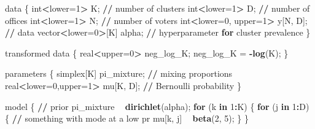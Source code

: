 \documentclass[12pt,letterpaper]{article}
\newenvironment{Shaded}{\begin{snugshade}}{\end{snugshade}}
\newcommand{\ControlFlowTok}[1]{\textcolor[rgb]{0.13,0.29,0.53}{\textbf{#1}}}
\newcommand{\DecValTok}[1]{\textcolor[rgb]{0.00,0.00,0.81}{#1}}
\newcommand{\ErrorTok}[1]{\textcolor[rgb]{0.64,0.00,0.00}{\textbf{#1}}}
\newcommand{\KeywordTok}[1]{\textcolor[rgb]{0.13,0.29,0.53}{\textbf{#1}}}
\newcommand{\NormalTok}[1]{#1}
\newcommand{\OperatorTok}[1]{\textcolor[rgb]{0.81,0.36,0.00}{\textbf{#1}}}
\newcommand{\StringTok}[1]{\textcolor[rgb]{0.31,0.60,0.02}{#1}}
\begin{document}
\begin{Shaded}
\begin{Highlighting}[]
\NormalTok{data \{}
\NormalTok{  int}\OperatorTok{<}\NormalTok{lower=}\DecValTok{1}\OperatorTok{>}\StringTok{ }\NormalTok{K;                }\OperatorTok{/}\ErrorTok{/}\StringTok{ }\NormalTok{number of clusters}
\NormalTok{  int}\OperatorTok{<}\NormalTok{lower=}\DecValTok{1}\OperatorTok{>}\StringTok{ }\NormalTok{D;                }\OperatorTok{/}\ErrorTok{/}\StringTok{ }\NormalTok{number of offices}
\NormalTok{  int}\OperatorTok{<}\NormalTok{lower=}\DecValTok{1}\OperatorTok{>}\StringTok{ }\NormalTok{N;                }\OperatorTok{/}\ErrorTok{/}\StringTok{ }\NormalTok{number of voters}
\NormalTok{  int}\OperatorTok{<}\NormalTok{lower=}\DecValTok{0}\NormalTok{, upper=}\DecValTok{1}\OperatorTok{>}\StringTok{ }\NormalTok{y[N, D]; }\OperatorTok{/}\ErrorTok{/}\StringTok{ }\NormalTok{data}
\NormalTok{  vector}\OperatorTok{<}\NormalTok{lower=}\DecValTok{0}\OperatorTok{>}\NormalTok{[K] alpha;      }\OperatorTok{/}\ErrorTok{/}\StringTok{ }\NormalTok{hyperparameter }\ControlFlowTok{for}\NormalTok{ cluster prevalence}
\NormalTok{\}}

\NormalTok{transformed data \{}
\NormalTok{  real}\OperatorTok{<}\NormalTok{upper=}\DecValTok{0}\OperatorTok{>}\StringTok{ }\NormalTok{neg_log_K;}
\NormalTok{  neg_log_K =}\StringTok{ }\OperatorTok{-}\KeywordTok{log}\NormalTok{(K);}
\NormalTok{\}}


\NormalTok{parameters \{}
\NormalTok{  simplex[K] pi_mixture;          }\OperatorTok{/}\ErrorTok{/}\StringTok{ }\NormalTok{mixing proportions}
\NormalTok{  real}\OperatorTok{<}\NormalTok{lower=}\DecValTok{0}\NormalTok{,upper=}\DecValTok{1}\OperatorTok{>}\StringTok{ }\NormalTok{mu[K, D]; }\OperatorTok{/}\ErrorTok{/}\StringTok{ }\NormalTok{Bernoulli probability}
\NormalTok{\}}

\NormalTok{model \{}
  \OperatorTok{/}\ErrorTok{/}\StringTok{ }\NormalTok{prior}
\NormalTok{  pi_mixture }\OperatorTok{~}\StringTok{ }\KeywordTok{dirichlet}\NormalTok{(alpha);}
  \ControlFlowTok{for}\NormalTok{ (k }\ControlFlowTok{in} \DecValTok{1}\OperatorTok{:}\NormalTok{K) \{}
    \ControlFlowTok{for}\NormalTok{ (j }\ControlFlowTok{in} \DecValTok{1}\OperatorTok{:}\NormalTok{D) \{}
      \OperatorTok{/}\ErrorTok{/}\StringTok{ }\NormalTok{something with mode at a low pr}
\NormalTok{      mu[k, j] }\OperatorTok{~}\StringTok{ }\KeywordTok{beta}\NormalTok{(}\DecValTok{2}\NormalTok{, }\DecValTok{5}\NormalTok{);}
\NormalTok{    \}}
\NormalTok{  \}}


\end{Highlighting}
\end{Shaded}
\end{document}
